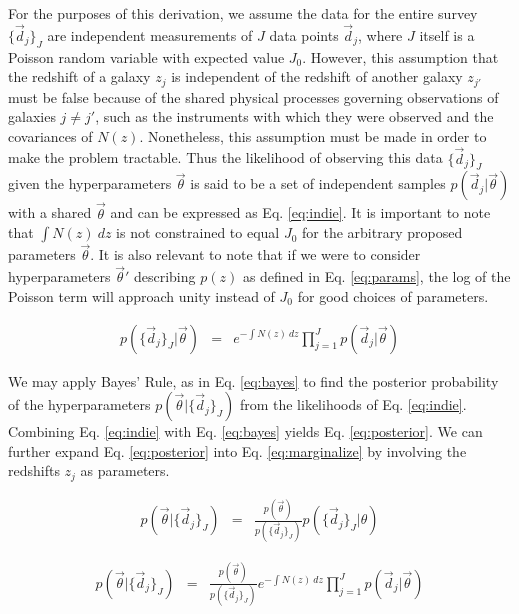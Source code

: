 \documentclass[preprint]{aastex}
\begin{document}
For the purposes of this derivation, we assume the data for the entire survey $\{\vec{d}_{j}\}_{J}$ are independent measurements of $J$ data points $\vec{d}_{j}$, where $J$ itself is a Poisson random variable with expected value $J_{0}$.  However, this assumption that the redshift of a galaxy $z_{j}$ is independent of the redshift of another galaxy $z_{j'}$ must be false because of the shared physical processes governing observations of galaxies $j\neq j'$, such as the instruments with which they were observed and the covariances of $N(z)$.  Nonetheless, this assumption must be made in order to make the problem tractable.  Thus the likelihood of observing this data $\{\vec{d}_{j}\}_{J}$ given the hyperparameters $\vec{\theta}$ is said to be a set of independent samples $p(\vec{d}_{j}|\vec{\theta})$ with a shared $\vec{\theta}$ and can be expressed as Eq. \ref{eq:indie}.  \citep{for14}  It is important to note that $\int N(z)\ dz$ is not constrained to equal $J_{0}$ for the arbitrary proposed parameters $\vec{\theta}$.  It is also relevant to note that if we were to consider hyperparameters $\vec{\theta}'$ describing $p(z)$ as defined in Eq. \ref{eq:params}, the log of the Poisson term will approach unity instead of $J_{0}$ for good choices of parameters.

\begin{eqnarray}
\label{eq:indie}
p(\{\vec{d}_{j}\}_{J}|\vec{\theta}) &=& e^{-\int N(z)\ dz}\prod_{j=1}^{J}p(\vec{d}_{j}|\vec{\theta})
\end{eqnarray}

We may apply Bayes' Rule, as in Eq. \ref{eq:bayes} to find the posterior probability of the hyperparameters $p(\vec{\theta}|\{\vec{d}_{j}\}_{J})$ from the likelihoods of Eq. \ref{eq:indie}.  Combining Eq. \ref{eq:indie} with Eq. \ref{eq:bayes} yields Eq. \ref{eq:posterior}.  We can further expand Eq. \ref{eq:posterior} into Eq. \ref{eq:marginalize} by involving the redshifts $z_{j}$ as parameters.

\begin{eqnarray}
\label{eq:bayes}
p(\vec{\theta}|\{\vec{d}_{j}\}_{J}) &=& \frac{p(\vec{\theta})}{p(\{\vec{d}_{j}\}_{J})}p(\{\vec{d}_{j}\}_{J}|\theta)
\end{eqnarray}

\begin{eqnarray}
\label{eq:posterior}
p(\vec{\theta}|\{\vec{d}_{j}\}_{J}) &=& \frac{p(\vec{\theta})}{p(\{\vec{d}_{j}\}_{J})}e^{-\int N(z)\ dz}\prod_{j=1}^{J}p(\vec{d}_{j}|\vec{\theta})
\end{eqnarray}
\end{document}
